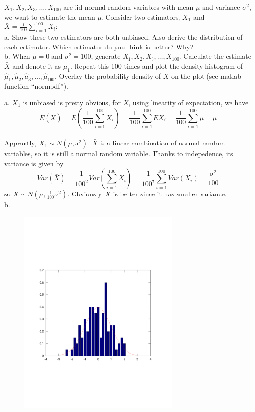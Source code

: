 \documentclass[12pt]{article}
\begin{document}
 {$X_1,X_2,X_3,\ldots,X_{100}$ are iid normal random 
variables with mean $\mu$ and variance $\sigma^2$, we want to estimate 
the mean $\mu$. Consider two estimators, $X_1$ and $\bar{X}=\frac{1}{100}\sum_{i=1}^{100}X_i$: \\
a. Show these two estimators are both unbiased. Also derive the
distribution of each estimator. Which estimator do you think is better? Why?\\
b. When $\mu=0$ and $\sigma^2=100$, generate $X_1,X_2,X_3,\ldots,X_{100}$. Calculate the estimate $\bar{X}$ and denote
it as $\hat{\mu}_1$. Repeat this 100 times and plot the density histogram of $\hat{\mu}_1,
\hat{\mu}_2,\hat{\mu}_3,\ldots,\hat{\mu}_{100}$. Overlay the probability density of $\bar{X}$ on the plot (see matlab function ``normpdf''). \\}
 { \vfill
  \answer
}
 {
 a. $X_1$ is unbiased is pretty obvious, for $\bar{X}$, using linearity of expectation, we have
  \[E(\bar{X})=E(\frac{1}{100}\sum_{i=1}^{100}X_i)=\frac{1}{100}\sum_{i=1}^{100}EX_i=\frac{1}{100}\sum_{i=1}^{100}\mu=\mu \]\\
   Apprantly, $X_1\sim N(\mu,\sigma^2)$. $\bar{X}$ is a linear combination of normal random variables, so it is still a normal random variable. Thanks to indepedence, its variance is given by 
   \[Var(\bar{X})=\frac{1}{100^2}Var(\sum_{i=1}^{100}X_i)=\frac{1}{100^2}\sum_{i=1}^{100}Var(X_i)=\frac{\sigma^2}{100}\]
  so $\bar{X}\sim N(\mu, \frac{1}{100}\sigma^2)$. Obviously, $\bar{X}$ is better since it has smaller variance.\\

 b.
 \begin{figure}[htbp]
  \centering
  \includegraphics[width=8cm]{hist.pdf}
  \end{figure}

} 
\end{document}
